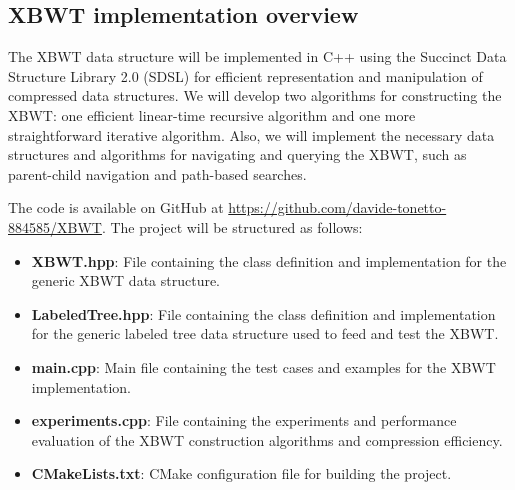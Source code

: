 \subsection{XBWT implementation overview}
The XBWT data structure will be implemented in C++ using the Succinct Data Structure Library 2.0 (SDSL) for efficient representation and manipulation of compressed data structures. We will develop two algorithms for constructing the XBWT: one efficient linear-time recursive algorithm and one more straightforward iterative algorithm. Also, we will implement the necessary data structures and algorithms for navigating and querying the XBWT, such as parent-child navigation and path-based searches. 

The code is available on GitHub at \url{https://github.com/davide-tonetto-884585/XBWT}. The project will be structured as follows:

\begin{itemize}
    \item \textbf{XBWT.hpp}: File containing the class definition and implementation for the generic XBWT data structure.
    \item \textbf{LabeledTree.hpp}: File containing the class definition and implementation for the generic labeled tree data structure used to feed and test the XBWT.
    \item \textbf{main.cpp}: Main file containing the test cases and examples for the XBWT implementation.
    \item \textbf{experiments.cpp}: File containing the experiments and performance evaluation of the XBWT construction algorithms and compression efficiency.
    \item \textbf{CMakeLists.txt}: CMake configuration file for building the project.
\end{itemize}
